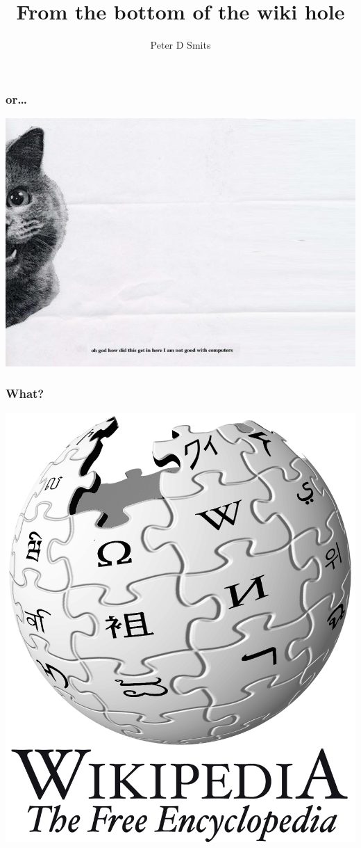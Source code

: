 \documentclass{beamer}
\title{From the bottom of the wiki hole}
\author{Peter D Smits}
\institute{Committee on Evolutionary Biology, University of Chicago}
\begin{document}
\begin{frame}
  \maketitle
\end{frame}

\begin{frame}
  \frametitle{or\dots}
  \includegraphics[width = \textwidth, keepaspectratio = true]{figure/happy_cat}
\end{frame}

\begin{frame}
  \frametitle{What?}
  \begin{center}
    \includegraphics[height = 0.8\textheight, keepaspectratio = true]{figure/wiki}
  \end{center}
\end{frame}
\end{document}
